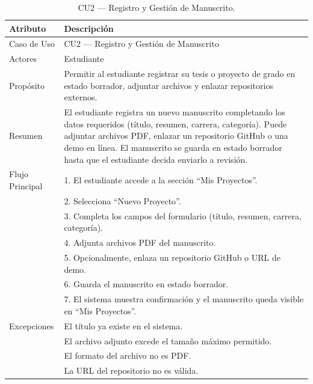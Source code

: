 \begin{table}[H]
\centering
\caption{CU2 — Registro y Gestión de Manuscrito.}
\label{tab:cu2}
\begin{tabular}{lp{10cm}}
\toprule
\textbf{Atributo} & \textbf{Descripción} \\
\midrule
Caso de Uso & CU2 — Registro y Gestión de Manuscrito \\
Actores & Estudiante \\
Propósito & Permitir al estudiante registrar su tesis o proyecto de grado en estado borrador, adjuntar archivos y enlazar repositorios externos. \\
Resumen & El estudiante registra un nuevo manuscrito completando los datos requeridos (título, resumen, carrera, categoría). Puede adjuntar archivos PDF, enlazar un repositorio GitHub o una demo en línea. El manuscrito se guarda en estado borrador hasta que el estudiante decida enviarlo a revisión. \\
Flujo Principal & 1. El estudiante accede a la sección ``Mis Proyectos''. \\
& 2. Selecciona ``Nuevo Proyecto''. \\
& 3. Completa los campos del formulario (título, resumen, carrera, categoría). \\
& 4. Adjunta archivos PDF del manuscrito. \\
& 5. Opcionalmente, enlaza un repositorio GitHub o URL de demo. \\
& 6. Guarda el manuscrito en estado borrador. \\
& 7. El sistema muestra confirmación y el manuscrito queda visible en ``Mis Proyectos''. \\
Excepciones & El título ya existe en el sistema. \\
& El archivo adjunto excede el tamaño máximo permitido. \\
& El formato del archivo no es PDF. \\
& La URL del repositorio no es válida. \\
\bottomrule
\end{tabular}
\end{table}

